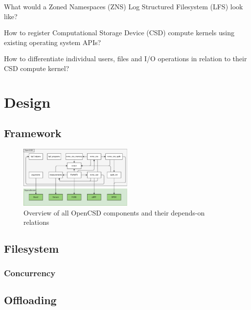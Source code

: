 \documentclass[conference]{IEEEtran}
\begin{document}
What would a Zoned Namespaces (ZNS) Log Structured Filesystem (LFS) look like?

How to register Computational Storage Device (CSD) compute kernels using
existing operating system APIs?

How to differentiate individual users, files and I/O operations in relation to
their CSD compute kernel?

\section{Design}

\subsection{Framework}


\begin{figure}
    \centering
	\label{figure:moduledependencies}
	\includegraphics[width=0.5\textwidth]{resources/images/module-dependencies.pdf}
	\caption{Overview of all OpenCSD components and their depends-on relations}
\end{figure}

\subsection{Filesystem}


\subsubsection{Concurrency}

\subsection{Offloading}
\end{document}
